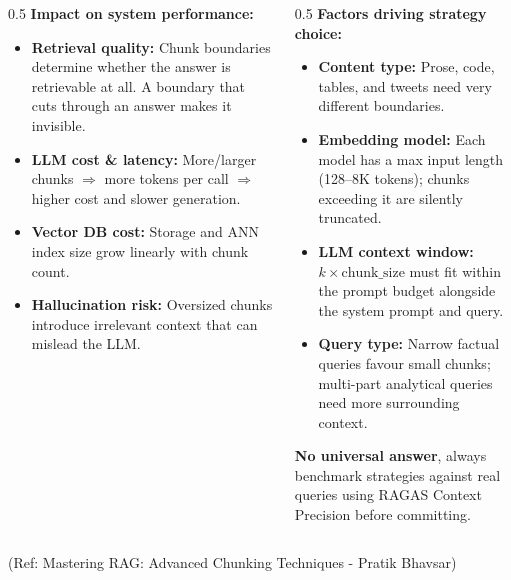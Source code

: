 \begin{frame}[fragile]
\begin{columns}
  \begin{column}[T]{0.5\linewidth}
    \textbf{Impact on system performance:}
    \begin{itemize}
      \item \textbf{Retrieval quality:} Chunk boundaries determine whether the answer is retrievable at all. A boundary that cuts through an answer makes it invisible.
      \item \textbf{LLM cost \& latency:} More/larger chunks $\Rightarrow$ more tokens per call $\Rightarrow$ higher cost and slower generation.
      \item \textbf{Vector DB cost:} Storage and ANN index size grow linearly with chunk count.
      \item \textbf{Hallucination risk:} Oversized chunks introduce irrelevant context that can mislead the LLM.
    \end{itemize}
  \end{column}
  \begin{column}[T]{0.5\linewidth}
    \textbf{Factors driving strategy choice:}
    \begin{itemize}
      \item \textbf{Content type:} Prose, code, tables, and tweets need very different boundaries.
      \item \textbf{Embedding model:} Each model has a max input length (128--8K tokens); chunks exceeding it are silently truncated.
      \item \textbf{LLM context window:} $k \times \text{chunk\_size}$ must fit within the prompt budget alongside the system prompt and query.
      \item \textbf{Query type:} Narrow factual queries favour small chunks; multi-part analytical queries need more surrounding context.
    \end{itemize}
    \vspace{0.2em}
    \textbf{No universal answer}, always benchmark strategies against real queries using RAGAS Context Precision before committing.
  \end{column}
\end{columns}

{\tiny (Ref: Mastering RAG: Advanced Chunking Techniques - Pratik Bhavsar)}

\end{frame}



